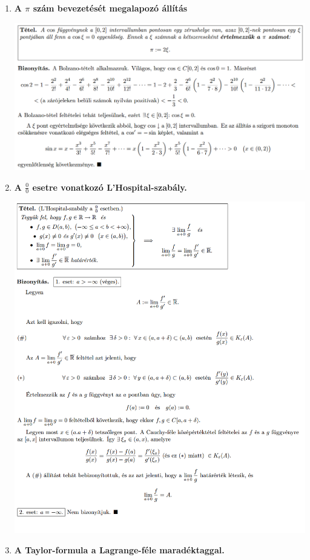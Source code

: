 \documentclass[a4paper,11.5pt]{article}
\begin{document}
\begin{enumerate}
		\item \textbf{A $\pi$ szám bevezetését megalapozó állítás}
		
		\includegraphics[width = \textwidth]{kepek/03.png}
		\pagebreak
		
		\item \textbf{A $\frac{0}{0}$ esetre vonatkozó L’Hospital-szabály.}
		
		\includegraphics[width = \textwidth]{kepek/04.png}
		
		\item \textbf{A Taylor-formula a Lagrange-féle maradéktaggal.}
		

\end{enumerate}
\end{document}
